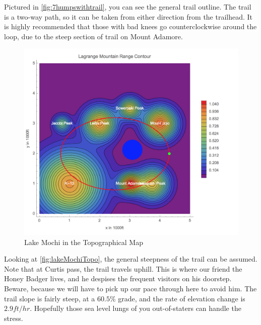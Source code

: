 \documentclass[12pt]{article}   %
\theoremstyle{definition}
\numberwithin{equation}{section}
\begin{document}
\quad Pictured in \autoref{fig:7humpswithtrail}, you can see the general trail outline. The trail is a two-way path, so it can be taken from either direction from the trailhead. It is highly recommended that those with bad knees go counterclockwise around the loop, due to the steep section of trail on Mount Adamore.

\begin{figure} [h]
  \centering
  \includegraphics[width=12cm]{../images/topoLake.png}
  \caption{Lake Mochi in the Topographical Map}
  \label{fig:lakeMochiTopo}
\end{figure}

\quad Looking at \autoref{fig:lakeMochiTopo}, the general steepness of the trail can be assumed. Note that at Curtis pass, the trail travels uphill. This is where our friend the Honey Badger lives, and he despises the frequent visitors on his doorstep. Beware, because we will have to pick up our pace through here to avoid him. The trail slope is fairly steep, at a $60.5\%$ grade, and the rate of elevation change is $2.9ft/hr$. Hopefully those sea level lungs of you out-of-staters can handle the stress.
\end{document}
